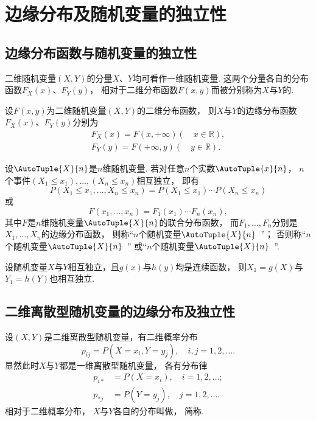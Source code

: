 \section{边缘分布及随机变量的独立性}
\subsection{边缘分布函数与随机变量的独立性}
\begin{definition}
二维随机变量\((X,Y)\)的分量\(X\)、\(Y\)均可看作一维随机变量.
这两个分量各自的分布函数\(F_X(x)\)、\(F_Y(y)\)，
相对于二维分布函数\(F(x,y)\)而被分别称为\(X\)与\(Y\)的.
\end{definition}

\begin{theorem}\label{theorem:多维随机变量及其分布.联合密度、边缘密度的关系}
设\(F(x,y)\)为二维随机变量\((X,Y)\)的二维分布函数，
则\(X\)与\(Y\)的边缘分布函数\(F_X(x)\)、\(F_Y(y)\)分别为\begin{gather*}
	F_X(x) = F(x,+\infty)
	(\quad x \in \mathbb{R}), \\
	F_Y(y) = F(+\infty,y)
	(\quad y \in \mathbb{R}).
\end{gather*}
\end{theorem}

\begin{definition}\label{definition:多维随机变量及其分布.随机变量的独立性}
设\(\AutoTuple{X}{n}\)是\(n\)维随机变量.
若对任意\(n\)个实数\(\AutoTuple{x}{n}\)，
\(n\)个事件\((X_1 \leq x_1),\dotsc,(X_n \leq x_n)\)相互独立，
即有\[
	P(X_1 \leq x_1,\dotsc,X_n \leq x_n)
	= P(X_1 \leq x_1) \dotsm P(X_n \leq x_n)
\]
或\[
	F(x_1,\dotsc,x_n)
	= F_1(x_1) \dotsm F_n(x_n),
\]
其中\(F\)是\(n\)维随机变量\(\AutoTuple{X}{n}\)的联合分布函数，
而\(F_1,\dotsc,F_n\)分别是\(X_1,\dotsc,X_n\)的边缘分布函数，
则称“\(n\)个随机变量\(\AutoTuple{X}{n}\)~”；
否则称“\(n\)个随机变量\(\AutoTuple{X}{n}\)~”
或“\(n\)个随机变量\(\AutoTuple{X}{n}\)~”.
\end{definition}

\begin{theorem}
设随机变量\(X\)与\(Y\)相互独立，且\(g(x)\)与\(h(y)\)均是连续函数，
则\(X_1 = g(X)\)与\(Y_1 = h(Y)\)也相互独立.
\end{theorem}

\subsection{二维离散型随机变量的边缘分布及独立性}
\begin{definition}
设\((X,Y)\)是二维离散型随机变量，有二维概率分布\[
	p_{ij} = P(X=x_i,Y=y_j), \quad i,j=1,2,\dotsc.
\]
显然此时\(X\)与\(Y\)都是一维离散型随机变量，
各有分布律\begin{align*}
	p_{i*} &= P(X=x_i), \quad i=1,2,\dotsc; \\
	p_{*j} &= P(Y=y_j), \quad j=1,2,\dotsc.
\end{align*}
相对于二维概率分布，
\(X\)与\(Y\)各自的分布叫做，
简称.
\end{definition}

